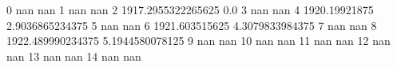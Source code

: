 0 nan nan
1 nan nan
2 1917.2955322265625 0.0
3 nan nan
4 1920.19921875 2.9036865234375
5 nan nan
6 1921.603515625 4.3079833984375
7 nan nan
8 1922.489990234375 5.1944580078125
9 nan nan
10 nan nan
11 nan nan
12 nan nan
13 nan nan
14 nan nan
